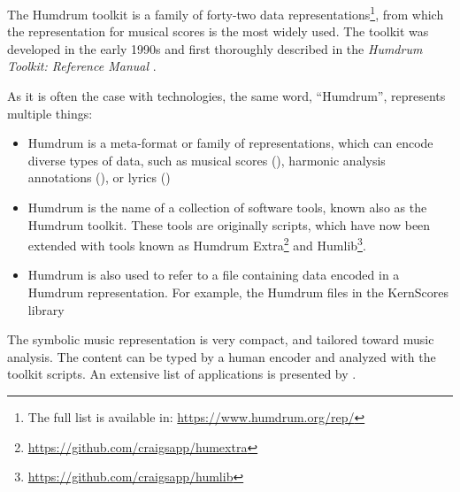 


The Humdrum toolkit is a family of forty-two data
representations\footnote{The full list is available in:
\href{https://www.humdrum.org/rep/}{https://www.humdrum.org/rep/}},
from which the  representation for musical
scores is the most widely used. The toolkit was developed in
the early 1990s and first thoroughly described in the
\emph{Humdrum Toolkit: Reference Manual}
\parencite{huron1994humdrum}.

As it is often the case with technologies, the same word,
``Humdrum'', represents multiple things:

\begin{itemize}
    \item Humdrum is a meta-format or family of
    representations, which can encode diverse types of data,
    such as musical scores (), harmonic
    analysis annotations (), or lyrics
    ()
    \item Humdrum is the name of a collection of software
    tools, known also as the Humdrum toolkit. These tools
    are originally  scripts, which have now been
    extended with  tools known as Humdrum
    Extra\footnote{\href{https://github.com/craigsapp/humextra}{https://github.com/craigsapp/humextra}}
    and
    Humlib\footnote{\href{https://github.com/craigsapp/humlib}{https://github.com/craigsapp/humlib}}.
    \item Humdrum is also used to refer to a file containing
    data encoded in a Humdrum representation. For example,
    the Humdrum files in the KernScores library
    \parencite{sapp2005online} \end{itemize}


The  symbolic music representation is very
compact, and tailored toward music analysis. The content can
be typed by a human encoder and analyzed with the toolkit
scripts. An extensive list of applications is presented by
\textcite{sapp2011computational}.

